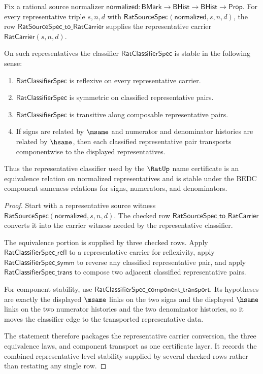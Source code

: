 \begin{theorem}
\label{thm:rat-representative-classifier-stability-package}
Fix a rational source normalizer
$\mathsf{normalized}:\mathsf{BMark}\to\mathsf{BHist}\to\mathsf{BHist}\to\mathsf{Prop}$.
For every representative triple $s,n,d$ with
$\mathsf{RatSourceSpec}(\mathsf{normalized},s,n,d)$, the row
$\mathsf{RatSourceSpec\_to\_RatCarrier}$ supplies the representative carrier
$\mathsf{RatCarrier}(s,n,d)$.

On such representatives the classifier
$\mathsf{RatClassifierSpec}$ is stable in the following sense:
\begin{enumerate}
\item $\mathsf{RatClassifierSpec}$ is reflexive on every representative
carrier.
\item $\mathsf{RatClassifierSpec}$ is symmetric on classified representative
pairs.
\item $\mathsf{RatClassifierSpec}$ is transitive along composable
representative pairs.
\item If signs are related by $\msame$ and numerator and denominator histories
are related by $\hsame$, then each classified representative pair transports
componentwise to the displayed representatives.
\end{enumerate}
Thus the representative classifier used by the $\RatUp$ name certificate is
an equivalence relation on normalized representatives and is stable under
the BEDC component sameness relations for signs, numerators, and denominators.
\end{theorem}
\begin{proof}
Start with a representative source witness
$\mathsf{RatSourceSpec}(\mathsf{normalized},s,n,d)$. The checked row
$\mathsf{RatSourceSpec\_to\_RatCarrier}$ converts it into the carrier witness
needed by the representative classifier.

The equivalence portion is supplied by three checked rows. Apply
$\mathsf{RatClassifierSpec\_refl}$ to a representative carrier for
reflexivity, apply $\mathsf{RatClassifierSpec\_symm}$ to reverse any classified
representative pair, and apply $\mathsf{RatClassifierSpec\_trans}$ to compose
two adjacent classified representative pairs.

For component stability, use
$\mathsf{RatClassifierSpec\_component\_transport}$. Its hypotheses are exactly
the displayed $\msame$ links on the two signs and the displayed $\hsame$ links
on the two numerator histories and the two denominator histories, so it moves
the classifier edge to the transported representative data.

The statement therefore packages the representative carrier conversion, the
three equivalence laws, and component transport as one certificate layer. It
records the combined representative-level stability supplied by several
checked rows rather than restating any single row.
\end{proof}
